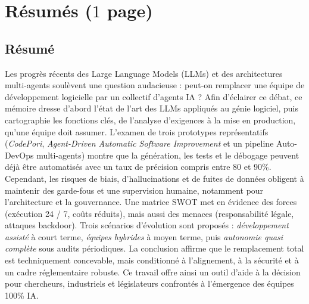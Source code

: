 \chapter*{Résumés ($1$ page)}
\section*{Résumé}
Les progrès récents des Large Language Models (LLMs) et des architectures multi-agents soulèvent une question audacieuse : peut-on remplacer une équipe de développement logicielle par un collectif d’agents IA ?  Afin d’éclairer ce débat, ce mémoire dresse d’abord l’état de l’art des LLMs appliqués au génie logiciel, puis cartographie les fonctions clés, de l’analyse d’exigences à la mise en production, qu’une équipe doit assumer.  L’examen de trois prototypes représentatifs (\textit{CodePori}, \textit{Agent-Driven Automatic Software Improvement} et un pipeline Auto-DevOps multi-agents) montre que la génération, les tests et le débogage peuvent déjà être automatisés avec un taux de précision compris entre 80 et 90\%.  Cependant, les risques de biais, d’hallucinations et de fuites de données obligent à maintenir des garde-fous et une supervision humaine, notamment pour l’architecture et la gouvernance.  Une matrice SWOT met en évidence des forces (exécution 24 / 7, coûts réduits), mais aussi des menaces (responsabilité légale, attaques backdoor).  Trois scénarios d’évolution sont proposés : \emph{développement assisté} à court terme, \emph{équipes hybrides} à moyen terme, puis \emph{autonomie quasi complète} sous audits périodiques.  La conclusion affirme que le remplacement total est techniquement concevable, mais conditionné à l’alignement, à la sécurité et à un cadre réglementaire robuste.  Ce travail offre ainsi un outil d’aide à la décision pour chercheurs, industriels et législateurs confrontés à l’émergence des équipes 100\% IA.


